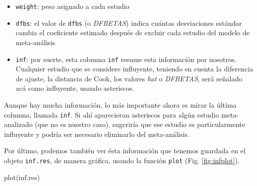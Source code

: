 \documentclass[
  bookmarksnumbered]{article}
\newenvironment{Shaded}{\begin{snugshade}}{\end{snugshade}}
\newcommand{\FunctionTok}[1]{\textcolor[rgb]{0.39,0.29,0.61}{#1}}
\newcommand{\NormalTok}[1]{\textcolor[rgb]{0.12,0.11,0.11}{#1}}
\begin{document}
\begin{itemize}
\item
  \texttt{weight}: peso asignado a cada estudio
\item
  \texttt{dfbs}: el valor de \texttt{dfbs} (o \emph{DFBETAS}) indica cuántas desviaciones estándar cambia el coeficiente estimado después de excluir cada estudio del modelo de meta-análisis
\item
  \texttt{inf}: por suerte, esta columna \texttt{inf} resume esta información por nosotros. Cualquier estudio que se considere influyente, teniendo en cuenta la diferencia de ajuste, la distancia de Cook, los valores \emph{hat} o \emph{DFBETAS}, será señalado acá como influyente, usando asteriscos.
\end{itemize}

Aunque hay mucha información, lo más importante ahora es mirar la última columna, llamada \texttt{inf}. Si ahí aparecieran asteriscos para algún estudio meta-analizado (que no es nuestro caso), sugeriría que ese estudio es particularmente influyente y podría ser necesario eliminarlo del meta-análisis.

Por último, podemos también ver ésta información que tenemos guardada en el objeto \texttt{inf.res}, de manera gráfica, usando la función \texttt{plot} (Fig. \ref{fig:infplot}).

\begin{Shaded}
\begin{Highlighting}[]
\FunctionTok{plot}\NormalTok{(inf.res)}
\end{Highlighting}
\end{Shaded}
\end{document}
